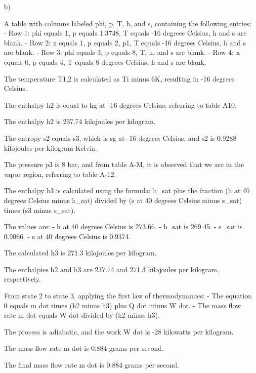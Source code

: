 b)

A table with columns labeled phi, p, T, h, and s, containing the following entries:
- Row 1: phi equals 1, p equals 1.3748, T equals -16 degrees Celsius, h and s are blank.
- Row 2: x equals 1, p equals 2, p1, T equals -16 degrees Celsius, h and s are blank.
- Row 3: phi equals 3, p equals 8, T, h, and s are blank.
- Row 4: x equals 0, p equals 4, T equals 8 degrees Celsius, h and s are blank.

The temperature T1,2 is calculated as Ti minus 6K, resulting in -16 degrees Celsius.

The enthalpy h2 is equal to hg at -16 degrees Celsius, referring to table A10.

The enthalpy h2 is 237.74 kilojoules per kilogram.

The entropy s2 equals s3, which is sg at -16 degrees Celsius, and s2 is 0.9288 kilojoules per kilogram Kelvin.

The pressure p3 is 8 bar, and from table A-M, it is observed that we are in the vapor region, referring to table A-12.

The enthalpy h3 is calculated using the formula: h_sat plus the fraction (h at 40 degrees Celsius minus h_sat) divided by (s at 40 degrees Celsius minus s_sat) times (s3 minus s_sat).

The values are:
- h at 40 degrees Celsius is 273.66.
- h_sat is 269.45.
- s_sat is 0.9066.
- s at 40 degrees Celsius is 0.9374.

The calculated h3 is 271.3 kilojoules per kilogram.

The enthalpies h2 and h3 are 237.74 and 271.3 kilojoules per kilogram, respectively.

From state 2 to state 3, applying the first law of thermodynamics:
- The equation 0 equals m dot times (h2 minus h3) plus Q dot minus W dot.
- The mass flow rate m dot equals W dot divided by (h2 minus h3).

The process is adiabatic, and the work W dot is -28 kilowatts per kilogram.

The mass flow rate m dot is 0.884 grams per second.

The final mass flow rate m dot is 0.884 grams per second.